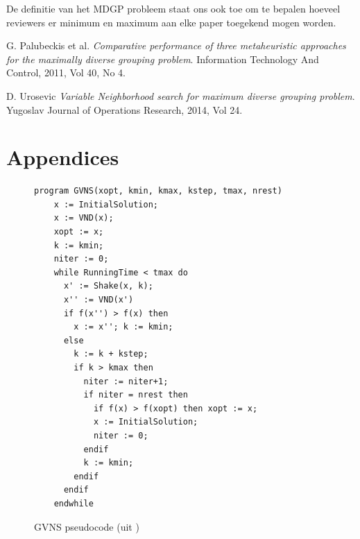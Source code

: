 \documentclass[pdftex,12pt,a4paper]{article}
\begin{document}
De definitie van het MDGP probleem staat ons ook toe om te bepalen hoeveel reviewers er minimum en maximum aan elke paper toegekend mogen worden. 

\newpage
\begin{thebibliography}{9}
  G. Palubeckis et al.
  \emph{Comparative performance of three metaheuristic approaches
for the maximally diverse grouping problem}.
  Information Technology And Control, 2011, Vol 40, No 4.
  
 D. Urosevic
 \emph{Variable Neighborhood search for maximum diverse grouping problem}.
 Yugoslav Journal of Operations Research, 2014, Vol 24.

\end{thebibliography}

\section{Appendices}
\begin{figure}[H]
\begin{verbatim}
program GVNS(xopt, kmin, kmax, kstep, tmax, nrest)
    x := InitialSolution;
    x := VND(x);
    xopt := x;
    k := kmin;
    niter := 0;
    while RunningTime < tmax do
      x' := Shake(x, k);
      x'' := VND(x')
      if f(x'') > f(x) then
        x := x''; k := kmin;
      else
        k := k + kstep;
        if k > kmax then
          niter := niter+1;
          if niter = nrest then
            if f(x) > f(xopt) then xopt := x;
            x := InitialSolution;
            niter := 0;
          endif
          k := kmin;
        endif
      endif
    endwhile
\end{verbatim}
\caption{GVNS pseudocode (uit \cite{Urosevic})}
\label{apx:gvns_pseudocode}
\end{figure}
\end{document}
